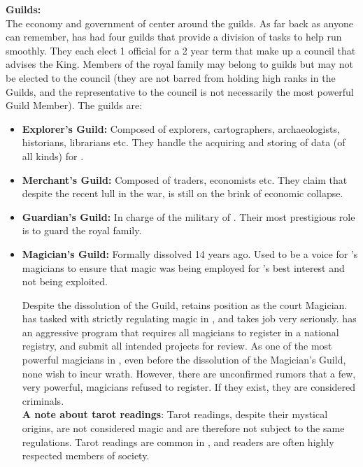\documentclass[blue]{NeptuneBall}
\begin{document}
{\bf Guilds:}\\
The economy and government of \pAtlantis{} center around the guilds. As far back as anyone can remember, \pAtlantis{} has had four guilds that provide a division of tasks to help \pAtlantis{} run smoothly. They each elect 1 official for a 2 year term that make up a council that advises the King.  Members of the royal family may belong to guilds but may not be elected to the council (they are not barred from holding high ranks in the Guilds, and the representative to the council is not necessarily the most powerful Guild Member). The guilds are:
\begin{itemize}
  \item {\bf Explorer's Guild:} Composed of explorers, cartographers, archaeologists, historians, librarians etc. They handle the acquiring and storing of data (of all kinds) for \pAtlantis{}.
  \item{\bf Merchant's Guild:} Composed of traders, economists etc. They claim that despite the recent lull in the war, \pAtlantis{} is  still on the brink of economic collapse.
  \item {\bf Guardian's Guild:} In charge of the military of \pAtlantis{}. Their most prestigious role is to guard the royal family.
  \item {\bf Magician's Guild:}  Formally dissolved 14 years ago. Used to be a voice for \pAtlantis{}'s magicians to ensure that magic was being employed for \pAtlantis{}'s best interest and not being exploited. 
  
  Despite the dissolution of the Guild, \cManta{} retains \cManta{\their} position as the court Magician. \cKing{} has tasked \cManta{} with strictly regulating magic in \pAtlantis{}, and \cManta{} takes \cManta{\their} job very seriously. \cManta{} has an aggressive program that requires all magicians to register in a national registry, and submit all intended projects for review. As one of the most powerful magicians in \pAtlantis{}, even before the dissolution of the Magician's Guild, none wish to incur \cManta{\their} wrath. However, there are unconfirmed rumors that a few, very powerful, magicians refused to register. If they exist, they are considered criminals.\\
  
  {\bf A note about tarot readings}: Tarot readings, despite their mystical origins, are not considered magic and are therefore not subject to the same regulations. Tarot readings are common in \pAtlantis{}, and readers are often highly respected members of society.
\end{itemize}
\end{document}
